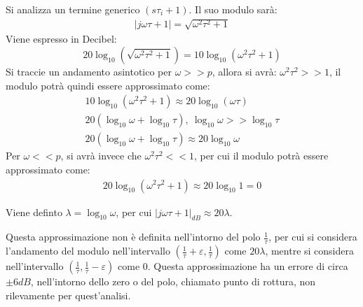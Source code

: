 \documentclass{article}
\numberwithin{equation}{subsection}
\begin{document}
Si analizza un termine generico $(s\tau_i+1)$. Il suo modulo sarà:
\begin{gather}
    |j\omega\tau+1|=\sqrt{\omega^2\tau^2+1}
\end{gather}
Viene espresso in Decibel:
\begin{equation}
    20\log_{10}\left(\sqrt{\omega^2\tau^2+1}\right)=10\log_{10}(\omega^2\tau^2+1)
\end{equation}
Si traccie un andamento asintotico per $\omega>>p$, allora si avrà: $\omega^2\tau^2>>1$, il modulo potrà quindi essere approssimato come:
\begin{gather}
    10\log_{10}(\omega^2\tau^2+1)\approx20\log_{10}(\omega\tau)\\
    20(\log_{10}\omega+\log_{10}\tau),\:\log_{10}\omega>>\log_{10}\tau\\
    20(\log_{10}\omega+\log_{10}\tau)\approx20\log_{10}\omega
\end{gather}
Per $\omega<<p$, si avrà invece che $\omega^2\tau^2<<1$, per cui il modulo potrà essere approssimato come:
\begin{gather}
    20\log_{10}(\omega^2\tau^2+1)\approx20\log_{10}1=0
\end{gather}

Viene definto $\lambda=\log_{10}\omega$, per cui $|j\omega\tau+1|_{dB}\approx20\lambda$.

\begin{center}
\end{center}

Questa approssimazione non è definita nell'intorno del polo 
$\displaystyle\frac{1}{\tau}$, per cui si considera l'andamento del modulo nell'intervallo $\left(\displaystyle\frac{1}{\tau}+\varepsilon,\frac{1}{\tau}\right)$ come 
$20\lambda$, mentre si considera nell'intervallo $\left(\displaystyle\frac{1}{\tau},\frac{1}{\tau}-\varepsilon\right)$ come $0$. Questa approssimazione ha un errore 
di circa $\pm6dB$, nell'intorno dello zero o del polo, chiamato punto di rottura, non rilevamente per quest'analisi.  
\end{document}
